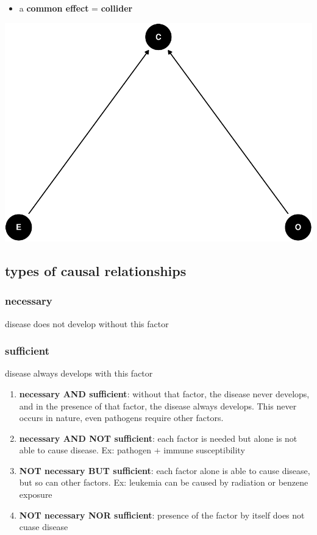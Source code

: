 \documentclass[
]{article}
\providecommand{\tightlist}{%
  \setlength{\itemsep}{0pt}\setlength{\parskip}{0pt}}
\begin{document}
\begin{itemize}
\tightlist
\item
  a \textbf{common effect} = \textbf{collider}
\end{itemize}

\includegraphics{index_files/figure-latex/dag3 1-1.pdf}

\hypertarget{types-of-causal-relationships}{%
\subsection{types of causal
relationships}\label{types-of-causal-relationships}}

\hypertarget{necessary}{%
\subsubsection{necessary}\label{necessary}}

disease does not develop without this factor

\hypertarget{sufficient}{%
\subsubsection{sufficient}\label{sufficient}}

disease always develops with this factor

\begin{enumerate}
\def\labelenumi{\arabic{enumi}.}
\item
  \textbf{necessary AND sufficient}: without that factor, the disease
  never develops, and in the presence of that factor, the disease always
  develops. This never occurs in nature, even pathogens require other
  factors.
\item
  \textbf{necessary AND NOT sufficient}: each factor is needed but alone
  is not able to cause disease. Ex: pathogen + immune susceptibility
\item
  \textbf{NOT necessary BUT sufficient}: each factor alone is able to
  cause disease, but so can other factors. Ex: leukemia can be caused by
  radiation or benzene exposure
\item
  \textbf{NOT necessary NOR sufficient}: presence of the factor by
  itself does not cuase disease
\end{enumerate}
\end{document}
